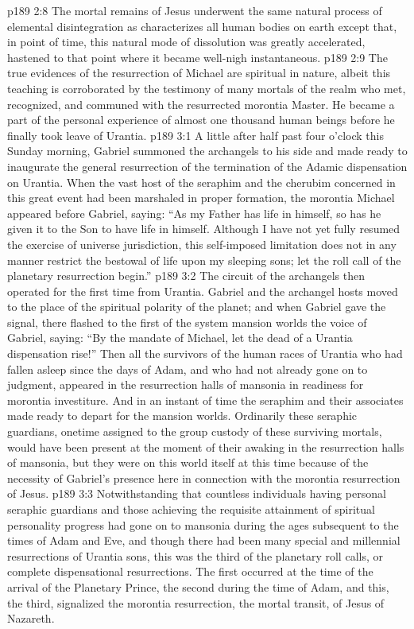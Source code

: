 \vs p189 2:8 The mortal remains of Jesus underwent the same natural process of elemental disintegration as characterizes all human bodies on earth except that, in point of time, this natural mode of dissolution was greatly accelerated, hastened to that point where it became well\hyp{}nigh instantaneous.
\vs p189 2:9 The true evidences of the resurrection of Michael are spiritual in nature, albeit this teaching is corroborated by the testimony of many mortals of the realm who met, recognized, and communed with the resurrected morontia Master. He became a part of the personal experience of almost one thousand human beings before he finally took leave of Urantia.
\vs p189 3:1 A little after half past four o’clock this Sunday morning, Gabriel summoned the archangels to his side and made ready to inaugurate the general resurrection of the termination of the Adamic dispensation on Urantia. When the vast host of the seraphim and the cherubim concerned in this great event had been marshaled in proper formation, the morontia Michael appeared before Gabriel, saying: \textcolor{ubdarkred}{“As my Father has life in himself, so has he given it to the Son to have life in himself. Although I have not yet fully resumed the exercise of universe jurisdiction, this self\hyp{}imposed limitation does not in any manner restrict the bestowal of life upon my sleeping sons; let the roll call of the planetary resurrection begin.”}
\vs p189 3:2 The circuit of the archangels then operated for the first time from Urantia. Gabriel and the archangel hosts moved to the place of the spiritual polarity of the planet; and when Gabriel gave the signal, there flashed to the first of the system mansion worlds the voice of Gabriel, saying: “By the mandate of Michael, let the dead of a Urantia dispensation rise!” Then all the survivors of the human races of Urantia who had fallen asleep since the days of Adam, and who had not already gone on to judgment, appeared in the resurrection halls of mansonia in readiness for morontia investiture. And in an instant of time the seraphim and their associates made ready to depart for the mansion worlds. Ordinarily these seraphic guardians, onetime assigned to the group custody of these surviving mortals, would have been present at the moment of their awaking in the resurrection halls of mansonia, but they were on this world itself at this time because of the necessity of Gabriel’s presence here in connection with the morontia resurrection of Jesus.
\vs p189 3:3 Notwithstanding that countless individuals having personal seraphic guardians and those achieving the requisite attainment of spiritual personality progress had gone on to mansonia during the ages subsequent to the times of Adam and Eve, and though there had been many special and millennial resurrections of Urantia sons, this was the third of the planetary roll calls, or complete dispensational resurrections. The first occurred at the time of the arrival of the Planetary Prince, the second during the time of Adam, and this, the third, signalized the morontia resurrection, the mortal transit, of Jesus of Nazareth.\plusone
